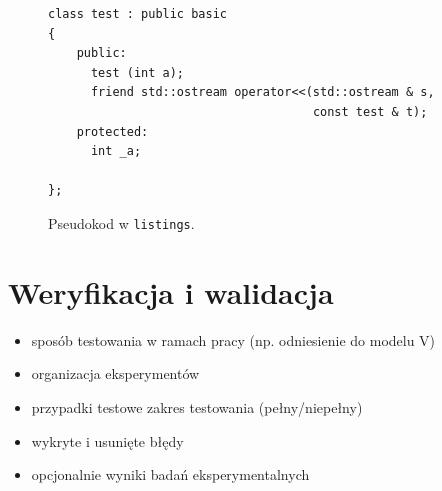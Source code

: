 \documentclass[a4paper,twoside,12pt]{book}
\begin{document}
\begin{figure}
\centering
\begin{lstlisting}
class test : public basic
{
    public:
      test (int a);
      friend std::ostream operator<<(std::ostream & s, 
                                     const test & t);
    protected:
      int _a;  
      
};
\end{lstlisting}
\caption{Pseudokod w \texttt{listings}.}
\label{fig:pseudokod:listings}
\end{figure}

%      




\chapter{Weryfikacja i walidacja}
\label{ch:06}
\begin{itemize}
\item sposób testowania w ramach pracy (np. odniesienie do modelu V)
\item organizacja eksperymentów
\item przypadki testowe zakres testowania (pełny/niepełny)
\item wykryte i usunięte błędy
\item opcjonalnie wyniki badań eksperymentalnych
\end{itemize}
\end{document}
